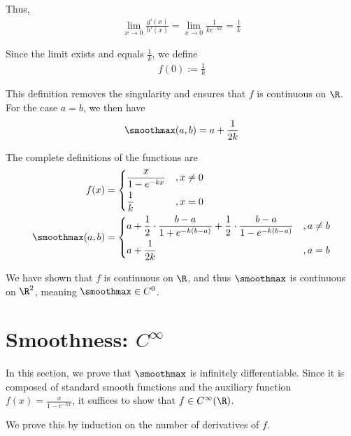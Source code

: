 Thus,
\begin{align}
    \lim_{x \to 0} \frac{g'(x)}{h'(x)} = \lim_{x \to 0} \frac{1}{k e^{-kx}} = \frac{1}{k}
\end{align}

Since the limit exists and equals $\frac{1}{k}$, we define
\begin{align}
    f(0) := \frac{1}{k}
\end{align}

This definition removes the singularity and ensures that $f$ is continuous on $\R$. For the case $a = b$, we then have
\begin{align}
    \smoothmax(a, b) = a + \frac{1}{2k}
\end{align}

The complete definitions of the functions are
\begin{align}
    f(x) &= \begin{dcases}
        \frac{x}{1 - e^{-kx}} &, x \neq 0 \\
        \frac{1}{k} &, x = 0
    \end{dcases} \\
    \smoothmax(a, b) &= \begin{dcases}
        a + \frac{1}{2} \cdot \frac{b - a}{1 + e^{-k(b - a)}} + \frac{1}{2} \cdot \frac{b - a}{1 - e^{-k(b - a)}} &, a \neq b \\
        a + \frac{1}{2k} &, a = b
    \end{dcases}
\end{align}

We have shown that $f$ is continuous on $\R$, and thus $\smoothmax$ is continuous on $\R^2$, meaning $\smoothmax \in C^0$.
\section{Smoothness: $C^\infty$}

In this section, we prove that $\smoothmax$ is infinitely differentiable. Since it is composed of standard smooth functions and the auxiliary function $f(x) = \frac{x}{1 - e^{-kx}}$, it suffices to show that $f \in C^\infty(\R)$.

We prove this by induction on the number of derivatives of $f$.


